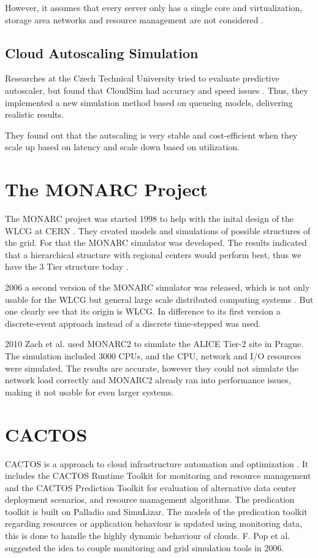 However, it assumes that every server only has a single core and virtualization, storage area networks and resource management are not considered \cite{survey_clouds}.


\subsection{Cloud Autoscaling Simulation}
Researches at the Czech Technical University tried to evaluate predictive autoscaler, but found that CloudSim had accuracy and speed issues \cite{autoscale_cloud}. Thus, they implemented a new simulation method based on queueing models, delivering realistic results. 

They found out that the autscaling is very stable and cost-efficient when they scale up based on latency and scale down based on utilization. 

\section{The MONARC Project}
The MONARC project was started 1998 to help with the inital design of the WLCG at CERN \cite{monarc2000models}. They created models and simulations of possible structures of the grid. For that the MONARC simulator was developed. 
The results indicated that a hierarchical structure with regional centers would perform best, thus we have the 3 Tier structure today \cite{morita2001validation}.

2006 a second version of the MONARC simulator was released, which is not only usable for the WLCG but general large scale distributed computing systems \cite{legrand2003monarc}. But one clearly see that its origin is WLCG. In difference to its first version a discrete-event approach instead of a discrete time-stepped was used.

2010 Zach et al. \cite{1742-6596-331-7-072038} used MONARC2 to simulate the ALICE Tier-2 site in Prague. The simulation included 3000 CPUs, and the CPU, network and I/O resources were simulated. The results are accurate, however they could not simulate the network load correctly and MONARC2 already ran into performance issues, making it not usable for even larger systems.


\section{CACTOS}
CACTOS is a approach to cloud infrastructure automation and optimization \cite{cactos}. It includes the 
CACTOS Runtime Toolkit for monitoring and resource management and the CACTOS Prediction Toolkit for evaluation of alternative data center deployment scenarios, and resource management algorithms.
The predication toolkit is built on Palladio and SimuLizar.
The models of the predication toolkit regarding resources or application behaviour is updated using monitoring data, this is done to handle the highly dynamic behaviour of clouds. F. Pop et al. \cite{1698650} suggested the idea to couple monitoring and grid simulation tools in 2006.

